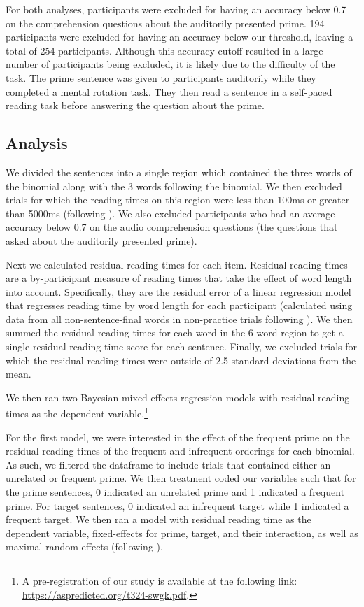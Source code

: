 \documentclass[
  12pt,
]{scrartcl}
\begin{document}
For both analyses, participants were excluded for having an accuracy
below 0.7 on the comprehension questions about the auditorily presented
prime. 194 participants were excluded for having an accuracy below our
threshold, leaving a total of 254 participants. Although this accuracy
cutoff resulted in a large number of participants being excluded, it is
likely due to the difficulty of the task. The prime sentence was given
to participants auditorily while they completed a mental rotation task.
They then read a sentence in a self-paced reading task before answering
the question about the prime.

\subsection{Analysis}\label{analysis}

We divided the sentences into a single region which contained the three
words of the binomial along with the 3 words following the binomial. We
then excluded trials for which the reading times on this region were
less than 100ms or greater than 5000ms (following
). We also excluded participants who had an average accuracy below
0.7 on the audio comprehension questions (the questions that asked about
the auditorily presented prime).

Next we calculated residual reading times for each item. Residual
reading times are a by-participant measure of reading times that take
the effect of word length into account. Specifically, they are the
residual error of a linear regression model that regresses reading time
by word length for each participant (calculated using data from all
non-sentence-final words in non-practice trials following
). We then summed the residual reading times for each word in the
6-word region to get a single residual reading time score for each
sentence. Finally, we excluded trials for which the residual reading
times were outside of 2.5 standard deviations from the mean.

We then ran two Bayesian mixed-effects regression models with residual
reading times as the dependent variable.\footnote{A pre-registration of
  our study is available at the following link:
  \url{https://aspredicted.org/t324-swgk.pdf}.}

For the first model, we were interested in the effect of the frequent
prime on the residual reading times of the frequent and infrequent
orderings for each binomial. As such, we filtered the dataframe to
include trials that contained either an unrelated or frequent prime. We
then treatment coded our variables such that for the prime sentences, 0
indicated an unrelated prime and 1 indicated a frequent prime. For
target sentences, 0 indicated an infrequent target while 1 indicated a
frequent target. We then ran a model with residual reading time as the
dependent variable, fixed-effects for prime, target, and their
interaction, as well as maximal random-effects (following
).
\end{document}
